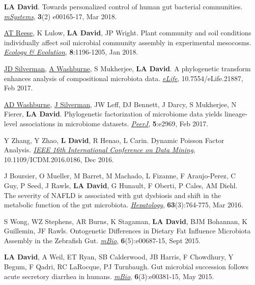 \documentclass[overlapped,line,11pt]{res}
\begin{document}
\begin{resume}
\begin{revnumerate}[26]
\item {\textbf{LA David}. Towards personalized control of human gut
  bacterial communities. \emph{\ul{mSystems}},
  \textbf{3}(2) e00165-17, Mar 2018.}

\item {\underline{AT Reese}, K Lulow, \textbf{LA David}, JP
  Wright. Plant community and soil conditions individually affect soil
  microbial community assembly in experimental
  mesocosms. \emph{\ul{Ecology \& Evolution}}, \textbf{8}:1196-1205,
  Jan 2018.}

\item {\underline{JD Silverman}, \underline{A Washburne}, S Mukherjee, \textbf{LA David}. A
  phylogenetic transform enhances analysis of compositional microbiota
  data. \emph{\underline{eLife}}, 10.7554/eLife.21887, Feb 2017.}

\item {\underline{AD Washburne}, \underline{J Silverman}, JW Leff, DJ
  Bennett, J Darcy, S Mukherjee, N Fierer, \textbf{LA
    David}. Phylogenetic factorization of microbiome data yields
  lineage-level associations in microbiome
  datasets. \emph{\underline{PeerJ}}, \textbf{5}:e2969, Feb 2017.}

\item {Y Zhang, Y Zhao, \textbf{L David}, R Henao, L Carin. Dynamic
  Poisson Factor Analysis. \emph{\ul{IEEE 16th International
      Conference on Data Mining}}, 10.1109/ICDM.2016.0186, Dec 2016.}

\item {J Boursier, O Mueller, M Barret, M Machado, L Fizanne, F
  Araujo-Perez, C Guy, P Seed, J Rawls, \textbf{LA David}, G Hunault, F
  Oberti, P Cales, AM Diehl. The severity of NAFLD is associated with
  gut dysbiosis and shift in the metabolic function of the gut
  microbiota. \emph{\underline{Hepatology}}, \textbf{63}(3):764-775, Mar 2016.}

\item {S Wong, WZ Stephens, AR Burns, K Stagaman, \textbf{LA David},
  BJM Bohannan, K Guillemin, JF Rawls.  Ontogenetic Differences in
  Dietary Fat Influence Microbiota Assembly in the Zebrafish Gut.
  \emph{\underline{mBio}}, \textbf{6}(5):e00687-15, Sept 2015.}

\item {\textbf{LA David}, A Weil, ET Ryan, SB Calderwood, JB Harris, F
  Chowdhury, Y Begum, F Qadri, RC LaRocque, PJ Turnbaugh.  Gut
  microbial succession follows acute secretory diarrhea in humans.
 \emph{\underline{mBio}}, \textbf{6}(3):e00381-15, May 2015.}


\end{revnumerate}
\end{resume}
\end{document}
